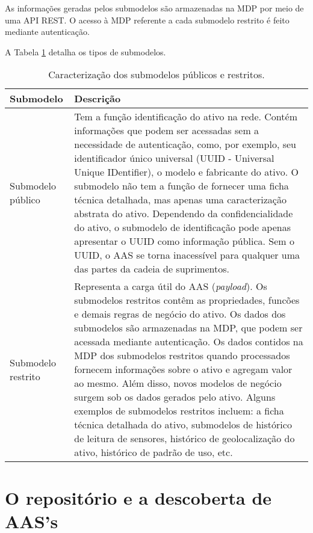 	As informações geradas pelos submodelos são armazenadas na MDP por meio de uma API REST. O acesso à MDP referente a cada submodelo restrito é feito mediante autenticação.
	
	A Tabela \ref{tab:submodelos-publicos-restritos} detalha os tipos de submodelos.
	
	
		\begin{table}[hbt!]
		\centering
		\caption{Caracterização dos submodelos públicos e restritos.}
		\begin{tabular}{|p{1.3in}|p{4in}|}
			
			\hline
			\textbf{Submodelo}
			&\textbf{Descrição} \\
			
			\hline
			Submodelo público
			& Tem a função identificação do ativo na rede. Contém informações que podem ser acessadas sem a necessidade de autenticação, como, por exemplo, seu identificador único universal (UUID - Universal Unique IDentifier), o modelo e fabricante do ativo. O submodelo não tem a função de fornecer uma ficha técnica detalhada, mas apenas uma caracterização abstrata do ativo. Dependendo da confidencialidade do ativo, o submodelo de identificação pode apenas apresentar o UUID como informação pública. Sem o UUID, o AAS se torna inacessível para qualquer uma das partes da cadeia de suprimentos. \\
			
			\hline
			Submodelo restrito
			& Representa a carga útil do AAS (\textit{payload}). Os submodelos restritos contêm as propriedades, funcões e demais regras de negócio do ativo. Os dados dos submodelos são armazenadas na MDP, que podem ser acessada mediante autenticação. Os dados contidos na MDP dos submodelos restritos quando processados fornecem informações sobre o ativo e agregam valor ao mesmo. Além disso, novos modelos de negócio surgem sob os dados gerados pelo ativo. Alguns exemplos de submodelos restritos incluem: a ficha técnica detalhada do ativo, submodelos de histórico de leitura de sensores, histórico de geolocalização do ativo, histórico de padrão de uso, etc.\\
			
		
			\hline
			
		\end{tabular}
		\label{tab:submodelos-publicos-restritos}
	\end{table}
	
\section{O repositório e a descoberta de AAS's}
	
